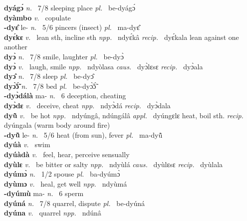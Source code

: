 {\bfseries dyágɔ́}  {\itshape n.~} 7/8 sleeping place {\itshape pl.~} be-dyágɔ́    \\ 
{\bfseries dyàmbo}  {\itshape v.~} copulate    \\ 
{\bfseries -dyɛ̂} le- {\itshape n.~} 5/6 pincers (insect) {\itshape pl.~} ma-dyɛ̂    \\ 
{\bfseries dyɛ́kɛ}  {\itshape v.~} lean sth, incline sth   {\itshape npp.~} ndyɛ́kâ {\itshape recip.~} dyɛ́kala lean against one another  \\ 
{\bfseries dyɔ̀}  {\itshape n.~} 7/8 smile, laughter {\itshape pl.~} be-dyɔ̀    \\ 
{\bfseries dyɔ̀}  {\itshape v.~} laugh, smile   {\itshape npp.~} ndyòlasa {\itshape caus.~} dyɔ̀lɛsɛ {\itshape recip.~} dyɔ̀ala  \\ 
{\bfseries dyɔ̂}  {\itshape n.~} 7/8 sleep {\itshape pl.~} be-dyɔ̂    \\ 
{\bfseries dyɔ̃̀ɔ̃́}  {\itshape n.~} 7/8 bed {\itshape pl.~} be-dyɔ̃̀ɔ̃́    \\ 
{\bfseries -dyɔ̀dálà} ma- {\itshape n.~} 6 deception, cheating    \\ 
{\bfseries dyɔ̀dɛ}  {\itshape v.~} deceive, cheat   {\itshape npp.~} ndyɔ̀dá {\itshape recip.~} dyɔ̀dala  \\ 
{\bfseries dyũ̀}  {\itshape v.~} be hot   {\itshape npp.~} ndyúngâ, ndúngálâ {\itshape appl.~} dyúngɛlɛ heat, boil sth. {\itshape recip.~} dyúngala (warm body around fire) \\ 
{\bfseries -dyũ̂} le- {\itshape n.~} 5/6 heat (from sun), fever {\itshape pl.~} ma-dyũ̂    \\ 
{\bfseries dyúà}  {\itshape v.~} swim    \\ 
{\bfseries dyúàdà}  {\itshape v.~} feel, hear, perceive sensually \\ 
{\bfseries dyùlɛ}  {\itshape v.~} be bitter or salty  {\itshape npp.~} ndyùlá {\itshape caus.~} dyùlɛsɛ {\itshape recip.~} dyùlala  \\ 
{\bfseries dyúmɔ̀}  {\itshape n.~} 1/2 spouse {\itshape pl.~} ba-dyúmɔ̀    \\ 
{\bfseries dyùmɔ}  {\itshape v.~} heal, get well   {\itshape npp.~} ndyùmá  \\ 
{\bfseries -dyúmù} ma- {\itshape n.~} 6 sperm   \\ 
{\bfseries dyúná}  {\itshape n.~} 7/8 quarrel, dispute {\itshape pl.~} be-dyúná    \\ 
{\bfseries dyúna}  {\itshape v.~} quarrel   {\itshape npp.~} ndúnâ  \\ 
